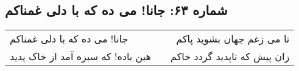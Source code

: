 \begin{center}
\section*{شماره ۶۳: جانا! می ده که با دلی غمناکم}
\label{sec:063}
\begin{longtable}{l p{0.5cm} r}
جانا! می ده که با دلی غمناکم
&&
تا می زغم جهان بشوید پاکم
\\
هین باده! که سبزه آمد از خاک پدید
&&
زان پیش که ناپدید گردد خاکم
\\
\end{longtable}
\end{center}
